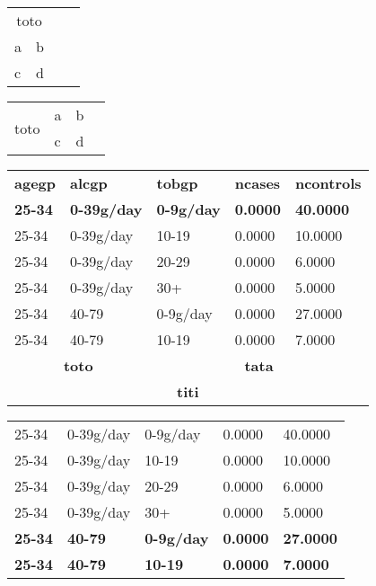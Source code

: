 \documentclass{article}
\begin{document}
\begin{tabular}{llll}
\multicolumn{2}{c}{toto} \\
a & b \\
c & d \\
\end{tabular}

\begin{tabular}{llll}

\multirow{2}{*}{toto} & a & b \\
& c & d \\
\end{tabular}

\begin{table}
\begin{tabular}{|lllll|}
\hline
 \textbf{agegp}  & \textbf{alcgp}      & \textbf{tobgp}     & \textbf{ncases}  & \textbf{ncontrols}   \\
 \textbf{25-34}  & \textbf{0-39g/day}  & \textbf{0-9g/day}  & \textbf{0.0000}  & \textbf{40.0000}     \\
 25-34           & 0-39g/day           & 10-19              & 0.0000           & 10.0000              \\
 25-34           & 0-39g/day           & 20-29              & 0.0000           & 6.0000               \\
 25-34           & 0-39g/day           & 30+                & 0.0000           & 5.0000               \\
 25-34           & 40-79               & 0-9g/day           & 0.0000           & 27.0000              \\
 25-34           & 40-79               & 10-19              & 0.0000           & 7.0000               \\\hline
\multicolumn{2}{c}{\textbf{toto}} & \multicolumn{3}{c}{\textbf{tata}} \\\hline
\multicolumn{5}{c}{\textbf{titi}} \\
\hline
\end{tabular}
\end{table}

\begin{table}
\begin{tabular}{|lllll|}
\hline
 25-34           & 0-39g/day       & 0-9g/day           & 0.0000           & 40.0000            \\
 25-34           & 0-39g/day       & 10-19              & 0.0000           & 10.0000            \\
 25-34           & 0-39g/day       & 20-29              & 0.0000           & 6.0000             \\
 25-34           & 0-39g/day       & 30+                & 0.0000           & 5.0000             \\\hline
 \textbf{25-34}  & \textbf{40-79}  & \textbf{0-9g/day}  & \textbf{0.0000}  & \textbf{27.0000}   \\\hline
 \textbf{25-34}  & \textbf{40-79}  & \textbf{10-19}     & \textbf{0.0000}  & \textbf{7.0000}    \\
\hline
\end{tabular}
\end{table}
\end{document}
